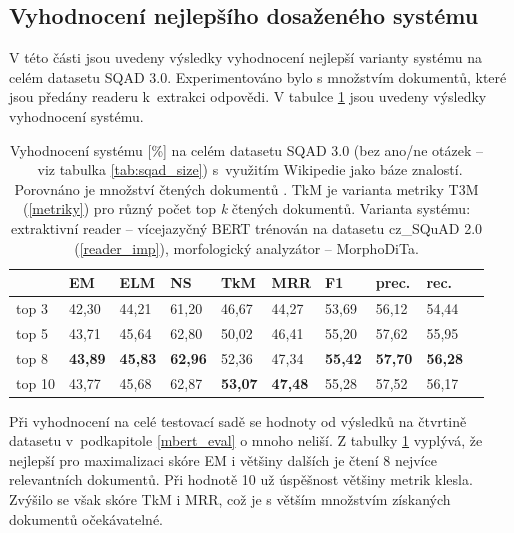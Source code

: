 \subsection{Vyhodnocení nejlepšího dosaženého systému}
\label{best_eval}
V této části jsou uvedeny výsledky vyhodnocení nejlepší varianty systému na celém datasetu SQAD 3.0. Experimentováno bylo s množstvím dokumentů, které jsou předány readeru k~extrakci odpovědi. V tabulce \ref{tab:final_evaluation} jsou uvedeny výsledky vyhodnocení systému.
\begin{table}[H]
    \centering
    \begin{tabular}{|l||l|l|l|l|l|l|l|l|l|}
        \hline
          & \textbf{EM}   & ELM       & NS        & TkM       & MRR       & \textbf{F1}   & prec.         & rec. \\ \hline\hline
            top 3    & 42,30         & 44,21     & 61,20     & 46,67     & 44,27     & 53,69         & 56,12         & 54,44    \\ \hline
            top 5    & 43,71         & 45,64     & 62,80     & 50,02     & 46,41     & 55,20         & 57,62         & 55,95    \\ \hline
            top 8   & \textbf{43,89}         & \textbf{45,83}     & \textbf{62,96}     & 52,36     & 47,34     & \textbf{55,42}         & \textbf{57,70}         & \textbf{56,28}    \\ \hline
            top 10   & 43,77         & 45,68     & 62,87     & \textbf{53,07}     & \textbf{47,48}     & 55,28         & 57,52        & 56,17    \\ \hline
    \end{tabular}
    \caption{Vyhodnocení systému [\%] na celém datasetu SQAD 3.0 (bez ano/ne otázek --~viz tabulka \ref{tab:sqad_size}) s~využitím Wikipedie jako báze znalostí. Porovnáno je množství čtených dokumentů . TkM je varianta metriky T3M (\ref{metriky}) pro různý počet top \emph{k} čtených dokumentů. Varianta systému: extraktivní reader -- vícejazyčný BERT trénován na datasetu cz\_SQuAD 2.0 (\ref{reader_imp}), morfologický analyzátor -- MorphoDiTa.}
    \label{tab:final_evaluation}
\end{table}
Při vyhodnocení na celé testovací sadě se hodnoty od výsledků na čtvrtině datasetu v~podkapitole \ref{mbert_eval} o mnoho neliší. Z tabulky \ref{tab:final_evaluation} vyplývá, že nejlepší pro maximalizaci skóre EM i většiny dalších je čtení 8 nejvíce relevantních dokumentů. Při hodnotě 10 už úspěšnost většiny metrik klesla. Zvýšilo se však skóre TkM i MRR, což je s větším množstvím získaných dokumentů očekávatelné.

